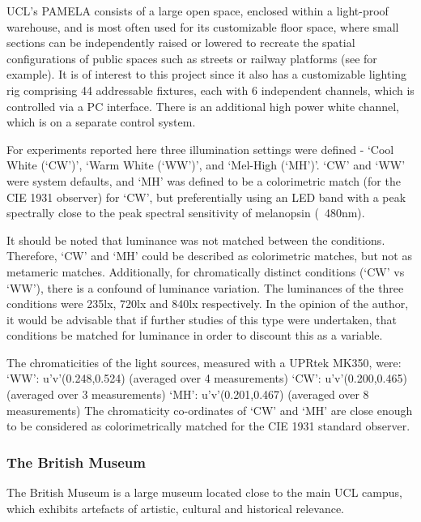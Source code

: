 \gls{UCL}'s \gls{PAMELA} consists of a large open space, enclosed within a light-proof warehouse, and is most often used for its customizable floor space, where small sections can be independently raised or lowered to recreate the spatial configurations of public spaces such as streets or railway platforms (see \citet{cheng_effect_2018} for example). It is of interest to this project since it also has a customizable lighting rig comprising 44 addressable fixtures, each with 6 independent channels, which is controlled via a PC interface. There is an additional high power white channel, which is on a separate control system. 


For experiments reported here three illumination settings were defined - `Cool White (`CW')', `Warm White (`WW')', and `Mel-High (`MH')'. `CW' and `WW' were system defaults, and `MH' was defined to be a colorimetric match (for the CIE 1931 observer) for `CW', but preferentially using an \gls{LED} band with a peak spectrally close to the peak spectral sensitivity of melanopsin (~480nm).

It should be noted that luminance was not matched between the conditions. Therefore, `CW' and `MH' could be described as colorimetric matches, but not as metameric matches. Additionally, for chromatically distinct conditions (`CW' vs `WW'), there is a confound of luminance variation. The luminances of the three conditions were 235lx, 720lx and 840lx respectively. In the opinion of the author, it would be advisable that if further studies of this type were undertaken, that conditions be matched for luminance in order to discount this as a variable. 


The chromaticities of the light sources, measured with a UPRtek MK350, were:
`WW': 	u'v'(0.248,0.524) (averaged over 4 measurements)
`CW': 	u'v'(0.200,0.465) (averaged over 3 measurements)
`MH': 	u'v'(0.201,0.467) (averaged over 8 measurements)
The chromaticity co-ordinates of `CW' and `MH' are close enough to be considered as colorimetrically matched for the CIE 1931 standard observer. %

\subsubsection{The British Museum} \label{sec:BM}

The British Museum is a large museum located close to the main \gls{UCL} campus, which exhibits artefacts of artistic, cultural and historical relevance. 

